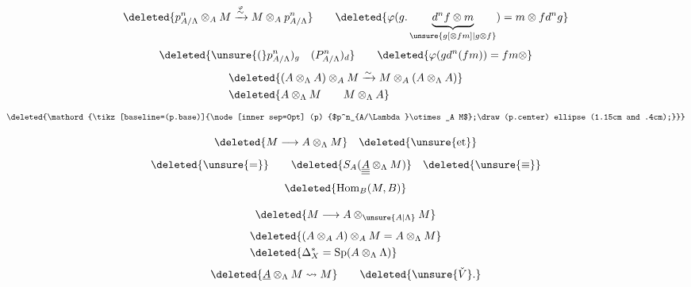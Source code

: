 \[
\deleted{p^n_{A/\Lambda}\otimes_A M\xrightarrow{\overset{\varphi}{\sim}}M\otimes_A p^n_{A/\Lambda}}\qquad
\deleted{\varphi(g.\underbrace{d^nf\otimes m}_{\unsure{g[{\otimes}fm]|g\otimes f}})=m\otimes f d^n g}
\]
\[
\deleted{\unsure{(}p^n_{A/\Lambda})_g\quad(P^n_{A/\Lambda})_d}\qquad
\deleted{\varphi(gd^n(fm))=fm\otimes}
\]
\[
\begin{aligned}
&\deleted{(A\otimes_\Lambda A)\otimes_A M\xrightarrow{\sim}M\otimes_A(A\otimes_\Lambda A)}\\
&\deleted{A\otimes_\Lambda M\qquad M\otimes_\Lambda A}
\end{aligned}
\]
\[
\deleted{\mathord{\tikz[baseline=(p.base)]{\node[inner sep=0pt] (p) {$p^n_{A/\Lambda}\otimes_A M$};\draw (p.center) ellipse (1.15cm and .4cm);}}}
\]

\[
\deleted{M\longrightarrow A\otimes_\Lambda M}\quad\deleted{\unsure{\text{et}}}
\]
\[
\deleted{\unsure{=}}\qquad\deleted{S_A(\underline{\underline{\underline A}}\otimes_\Lambda M)}\quad\deleted{\unsure{\equiv}}
\]
\[
\deleted{\operatorname{Hom}_{B}(M,B)}
\]

\[
\deleted{M\longrightarrow A\otimes_{\unsure{A|\Lambda}} M}
\]
\[
\begin{aligned}
&\deleted{(A\otimes_A A)\otimes_A M=A\otimes_\Lambda M}\\
&\deleted{\Delta_X^{\ast}=\operatorname{Sp}(A\otimes_\Lambda\Lambda)}
\end{aligned}
\]
\[
\deleted{\underline A\otimes_\Lambda M\leadsto M}\qquad\deleted{\unsure{\check V}.}
\]

